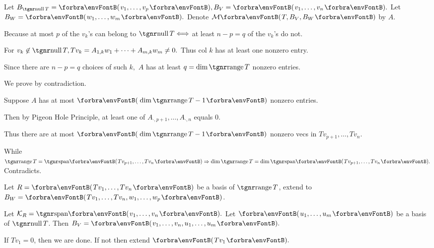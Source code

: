 \documentclass[a4paper, 11pt, UTF8]{article}
\begin{document}
\begin{large}
\par\quad
Let $B_{\null T}=\Par{v_1,\dots,v_p},B_{V}=\Par{v_1,\dots,v_n}.$ Let $B_W=\Par{w_1,\dots,w_m}.$ Denote $\Mt{T,B_V,B_W}$ by $A.$\vspace{4pt}\par\quad
Because at most $p$ of the $v_k$'s can belong to $\null T\Longleftrightarrow$ at least $n-p=q$ of the $v_k$'s do not.\par\quad
For $v_k\not\in\null T,Tv_k=A_{1,k}w_1+\dots+A_{m,k}w_m\neq 0.$ Thus col $k$ has at least one nonzero entry.\par\quad
Since there are $n-p=q$ choices of such $k,$ $A$ has at least $q=\dim\range T$ nonzero entries.\PfEnd\vspace{8pt}\par\quad
\Or We prove by contradiction.\par\quad
Suppose $A$ has at most $\Par{\dim\range T-1}$ nonzero entries.\par\quad
Then by Pigeon Hole Principle, at least one of $A_{\cdot,p+1},\dots,A_{\cdot,n}$ equals $0$.\par\quad
Thus there are at most $\Par{\dim\range T-1}$ nonzero vecs in $Tv_{p+1},\dots,Tv_n$.\par\quad
While $\range T=\Span{Tv_{p+1},\dots,Tv_n}\Rightarrow\dim\range T=\dim\Span{Tv_{p+1},\dots,Tv_n}.$ Contradicts.\PfEnd
\SepLine
\pagebreak

\par\quad
Let $R=\Par{Tv_1,\dots,Tv_n}$ be a basis of $\range T$, extend to  $B_W=\Par{Tv_1,\dots,Tv_n,w_1,\dots,w_p}$.\par\quad
Let $\mathcal{K}_R=\Span{v_1,\dots,v_n}.$ Let $\Par{u_1,\dots,u_m}$ be a basis of $\null T$. Then $B_V=\Par{v_1,\dots,v_n,u_1,\dots,u_m}.$\PfEnd
\SepLine

If $Tv_1=0$, then we are done. If not then extend $\Par{Tv_1}.$\PfEnd
\SepLine


\end{large}
\end{document}
